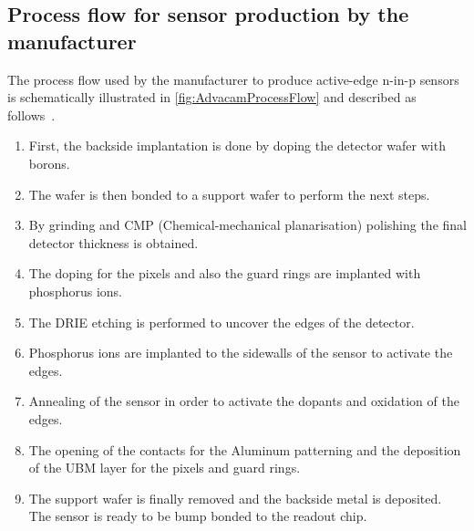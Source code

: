 \newpage
\subsection{Process flow for sensor production by the manufacturer}
\label{sec:AdvacamProcessFlow}

The process flow used by the manufacturer to produce active-edge
n-in-p sensors is schematically illustrated in
\cref{fig:AdvacamProcessFlow} and described as
follows~\cite{AdvacamProcessFlow}.

\begin{enumerate}[label=(\alph*)]
\item First, the backside implantation is done by doping the detector
  wafer with borons.
\item The wafer is then bonded to a support wafer to perform the next
  steps.
\item By grinding and CMP (Chemical-mechanical planarisation)
  polishing the final detector thickness is obtained.
\item The doping for the pixels and also the guard rings are implanted
  with phosphorus ions.
\item The DRIE etching is performed to uncover the edges of the
  detector.
\item Phosphorus ions are implanted to the sidewalls of the sensor to
  activate the edges.
\item Annealing of the sensor in order to activate the dopants and
  oxidation of the edges.
\item The opening of the contacts for the Aluminum patterning and the
  deposition of the UBM layer for the pixels and guard rings.
\item The support wafer is finally removed and the backside metal is
  deposited. The sensor is ready to be bump bonded to the readout
  chip.
\end{enumerate}


